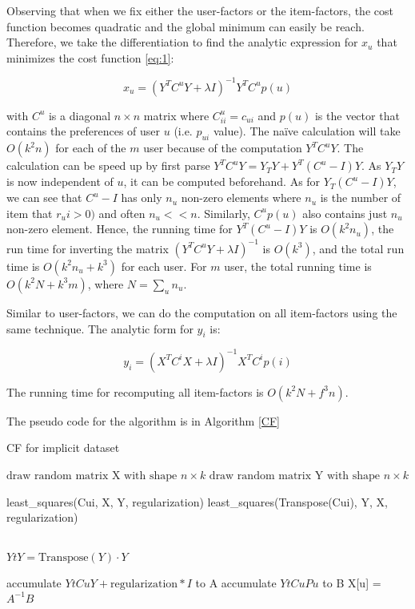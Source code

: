 Observing that when we fix either the user-factors or the item-factors, the cost function becomes quadratic and the global minimum can easily be reach. Therefore, we take the differentiation to find the analytic expression for \(x_u\) that minimizes the cost function \eqref{eq:1}:

\begin{displaymath}
x_u = (Y^T C^u Y + \lambda I)^{-1} Y^T C^u p(u)
\end{displaymath}

with \(C^u\) is a diagonal \(n \times n\) matrix where \(C^u_{ii} = c_{ui}\) and \(p(u)\) is the vector that contains the preferences of user \(u\) (i.e. \(p_{ui}\) value). The na\"ive calculation will take \(O(k^2n) \) for each of the \(m\) user because of the computation \(Y^T C^u Y\). The calculation can be speed up by first parse \(Y^T C^u Y = Y_TY + Y^T (C^u - I) Y \). As \(Y_TY\) is now independent of \(u\), it can be computed beforehand. As for \(Y_T (C^u - I)Y\), we can see that \(C^u - I\) has only \(n_u\) non-zero elements where \(n_u\) is the number of item that \(r_ui > 0) \) and often \(n_u << n\). Similarly, \(C^u p(u)\) also contains just \(n_u\) non-zero element. Hence, the running time for \(Y^T (C^u - I) Y\) is \(O(k^2 n_u)\), the run time for inverting the matrix \( (Y^T C^u Y + \lambda I)^{-1} \) is \(O(k^3) \), and the total run time is \(O(k^2 n_u + k^3)\) for each user. For \(m\) user, the total running time is \(O(k^2 N + k^3 m)\), where \(N = \sum_u n_u\). \hfill \break

\noindent Similar to user-factors, we can do the computation on all item-factors using the same technique. The analytic form for \(y_i\) is:

\begin{displaymath}
y_i = (X^T C^i X + \lambda I)^{-1} X^T C^i p(i)
\end{displaymath}

\noindent The running time for recomputing all item-factors is \(O(k^2 N + f^3n)\). \hfill \break

\noindent The pseudo code for the algorithm is in Algorithm \eqref{CF}

\begin{algorithm}
\caption{CF for implicit dataset} \label{CF}
\begin{algorithmic}[1]
	\State $\text{draw random matrix X with shape } n \times k $ 
	\State $\text{draw random matrix Y with shape } n \times k $
	
		\State least\_squares(Cui, X, Y, regularization)
		\State least\_squares(Transpose(Cui), Y, X, regularization)
	\EndFor

	\Return [w, b]
\EndFunction
\\
	\State $YtY = \text{Transpose}(Y) \cdot Y$
	
		\State accumulate $YtCuY + \text{regularization} * I$ to A
		\State accumulate $YtCuPu$ to B
		\State X[u] = $A^{-1}B$
	\EndFor
	
\EndFunction
\end{algorithmic}
\end{algorithm}

